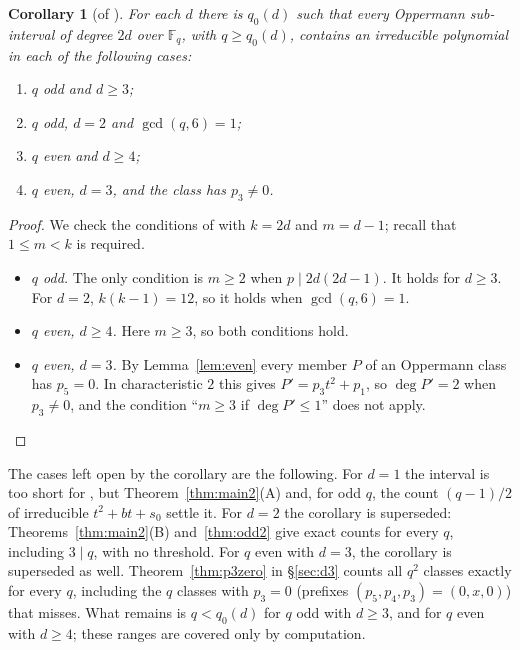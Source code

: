 \documentclass[11pt,a4paper]{amsart}
\newtheorem{corollary}[theorem]{Corollary}
\theoremstyle{definition}
\theoremstyle{remark}
\newcommand{\F}{\mathbb{F}}
\begin{document}
\begin{corollary}[of \cite{BBR}]\label{cor:BBR}
For each $d$ there is $q_0(d)$ such that every Oppermann sub-interval of degree $2d$ over $\F_q$, with $q\ge q_0(d)$,
contains an irreducible polynomial in each of the following cases:
\begin{enumerate}
\item $q$ odd and $d\ge3$;
\item $q$ odd, $d=2$ and $\gcd(q,6)=1$;
\item $q$ even and $d\ge4$;
\item $q$ even, $d=3$, and the class has $p_3\ne0$.
\end{enumerate}
\end{corollary}

\begin{proof}
We check the conditions of \cite{BBR} with $k=2d$ and $m=d-1$; recall that $1\le m<k$ is required.
\begin{itemize}
\item \emph{$q$ odd.} The only condition is $m\ge2$ when $p\mid 2d(2d-1)$. It holds for $d\ge3$. For $d=2$,
$k(k-1)=12$, so it holds when $\gcd(q,6)=1$.
\item \emph{$q$ even, $d\ge4$.} Here $m\ge3$, so both conditions hold.
\item \emph{$q$ even, $d=3$.} By Lemma~\ref{lem:even} every member $P$ of an Oppermann class has $p_5=0$. In
characteristic $2$ this gives $P'=p_3t^2+p_1$, so $\deg P'=2$ when $p_3\ne0$, and the condition ``$m\ge3$ if
$\deg P'\le1$'' does not apply.
\end{itemize}
\end{proof}

The cases left open by the corollary are the following. For $d=1$ the interval is too short for \cite{BBR}, but
Theorem~\ref{thm:main2}(A) and, for odd $q$, the count $(q-1)/2$ of irreducible $t^2+bt+s_0$ settle it. For $d=2$ the
corollary is superseded: Theorems~\ref{thm:main2}(B) and~\ref{thm:odd2} give exact counts for every $q$, including
$3\mid q$, with no threshold.
For $q$ even with $d=3$, the corollary is superseded as well. Theorem~\ref{thm:p3zero} in \S\ref{sec:d3}
counts all $q^2$ classes exactly for every $q$, including the $q$ classes with $p_3=0$ (prefixes
$(p_5,p_4,p_3)=(0,x,0)$) that \cite{BBR} misses. What remains is $q<q_0(d)$ for $q$ odd with $d\ge3$, and for $q$ even
with $d\ge4$; these ranges are covered only by computation.
\end{document}
